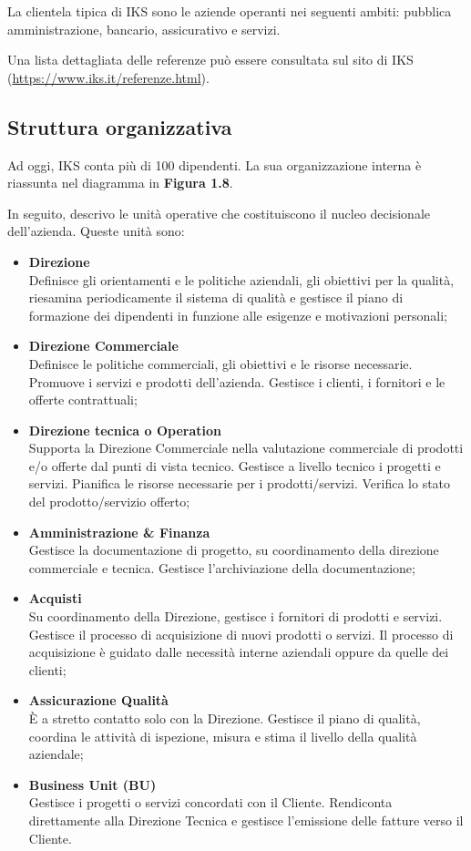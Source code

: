 La clientela tipica di IKS sono le aziende operanti nei seguenti ambiti: 
pubblica amministrazione, bancario, assicurativo e servizi. 

Una lista dettagliata delle referenze può essere consultata sul sito
di IKS (\url{https://www.iks.it/referenze.html}).

\subsection{Struttura organizzativa}

Ad oggi, IKS conta più di 100 dipendenti. La sua organizzazione interna è 
riassunta nel diagramma in \textbf{Figura 1.8}.

In seguito, descrivo le unità operative che costituiscono il nucleo 
decisionale dell'azienda. Queste unità sono:
\begin{itemize}
	\item \textbf{Direzione}\\ 
	Definisce gli orientamenti e le politiche aziendali, gli 
	obiettivi per la qualità, riesamina periodicamente il sistema di 
	qualità e gestisce il piano di formazione dei dipendenti in funzione 
	alle esigenze e motivazioni personali;
	\item \textbf{Direzione Commerciale}\\
	Definisce le politiche commerciali, gli obiettivi e le risorse 
	necessarie. Promuove i servizi e prodotti dell'azienda. Gestisce i 
	clienti, i fornitori e le offerte contrattuali;
	\item \textbf{Direzione tecnica o Operation}\\
	Supporta la Direzione Commerciale nella valutazione commerciale di 
	prodotti e/o offerte dal punti di vista tecnico. Gestisce a livello 
	tecnico i progetti e servizi. Pianifica le risorse necessarie per 
	i prodotti/servizi. Verifica lo stato del prodotto/servizio offerto;	
	\item \textbf{Amministrazione \& Finanza}\\
	Gestisce la documentazione di progetto, su coordinamento della direzione 
	commerciale e tecnica. Gestisce l'archiviazione della documentazione;
	\item \textbf{Acquisti}\\
	Su coordinamento della Direzione, gestisce i fornitori di prodotti e 
	servizi. Gestisce il processo di acquisizione di nuovi prodotti o 
	servizi. Il processo di acquisizione è guidato dalle necessità 
	interne aziendali oppure da quelle dei clienti;
	\item \textbf{Assicurazione Qualità}\\
	È a stretto contatto solo con la Direzione. Gestisce il piano di 
    qualità, coordina le attività di ispezione, misura e stima il livello 
	della qualità aziendale;
	\item \textbf{Business Unit (BU)}\\
	Gestisce i progetti o servizi concordati con il Cliente. Rendiconta 
	direttamente alla Direzione Tecnica e gestisce l'emissione delle 
	fatture verso il Cliente. 
\end{itemize}


